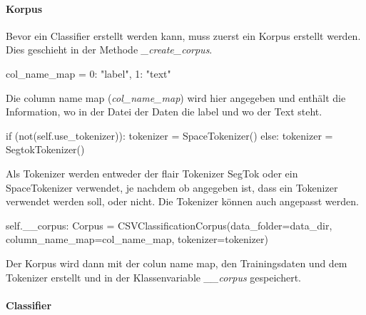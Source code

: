 \documentclass[10pt,a4paper]{article}
\begin{document}
\paragraph{Korpus}
\begin{flushleft}
Bevor ein Classifier erstellt werden kann, muss zuerst ein Korpus erstellt werden. Dies geschieht in der Methode \textit{\_create\_corpus}.

\begin{python}
col_name_map = {0: "label", 1: "text"}
\end{python}

Die column name map (\textit{col\_name\_map}) wird hier angegeben und enthält die Information, wo in der Datei der Daten die label und wo der Text steht.

\begin{python}
if (not(self.use_tokenizer)):
	tokenizer = SpaceTokenizer()
else:
	tokenizer = SegtokTokenizer()
\end{python}

Als Tokenizer werden entweder der flair Tokenizer SegTok oder ein SpaceTokenizer verwendet, je nachdem ob angegeben ist, dass ein Tokenizer verwendet werden soll, oder nicht. Die Tokenizer können auch angepasst werden.

\begin{python}
self.__corpus: Corpus = CSVClassificationCorpus(data_folder=data_dir,
    column_name_map=col_name_map,
    tokenizer=tokenizer)
\end{python}

Der Korpus wird dann mit der colun name map, den Trainingsdaten und dem Tokenizer erstellt und in der Klassenvariable \textit{\_\_corpus} gespeichert.
\end{flushleft}

\paragraph{Classifier}
\end{document}
